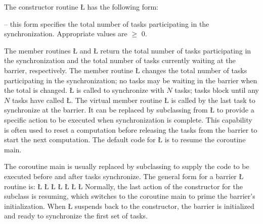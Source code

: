 \documentclass[openright,twoside]{report}
\begin{document}
The constructor routine \LGinlinetrue\LGbegin\lgrinde\L{}\endlgrinde\LGend{} has the following form:
\begin{prefix}
\item[\LGinlinetrue\LGbegin\lgrinde\L{\LB{\V{uBarrier}(\0\K{unsigned}\0\K{int}\0\V{total}\0)}}\endlgrinde\LGend{}]
-- this form specifies the total number of tasks participating in the synchronization.
Appropriate values are $\geq$ 0.
\end{prefix}

The member routines \LGinlinetrue\LGbegin\lgrinde\L{}\endlgrinde\LGend{} and \LGinlinetrue\LGbegin\lgrinde\L{}\endlgrinde\LGend{} return the total number of tasks participating in the synchronization and the total number of tasks currently waiting at the barrier, respectively.
The member routine \LGinlinetrue\LGbegin\lgrinde\L{}\endlgrinde\LGend{} changes the total number of tasks participating in the synchronization;
no tasks may be waiting in the barrier when the total is changed.
\LGinlinetrue\LGbegin\lgrinde\L{}\endlgrinde\LGend{} is called to synchronize with $N$ tasks;
tasks block until any $N$ tasks have called \LGinlinetrue\LGbegin\lgrinde\L{}\endlgrinde\LGend{}.
The virtual member routine \LGinlinetrue\LGbegin\lgrinde\L{}\endlgrinde\LGend{} is called by the last task to synchronize at the barrier.
It can be replaced by subclassing from \LGinlinetrue\LGbegin\lgrinde\L{}\endlgrinde\LGend{} to provide a specific action to be executed when synchronization is complete.
This capability is often used to reset a computation before releasing the tasks from the barrier to start the next computation.
The default code for \LGinlinetrue\LGbegin\lgrinde\L{}\endlgrinde\LGend{} is to resume the coroutine main.

The coroutine main is usually replaced by subclassing to supply the code to be executed before and after tasks synchronize.
The general form for a barrier \LGinlinetrue\LGbegin\lgrinde\L{}\endlgrinde\LGend{} routine is:
\LGinlinefalse\LGbegin\lgrinde
\L{}
\L{\LB{}}
\L{\LB{}}
\CE{}\L{\LB{}}
\L{\LB{}}
\CE{}\L{\LB{}}
\L{\LB{\}}}
\endlgrinde\LGend
Normally, the last action of the constructor for the subclass is resuming, which switches to the coroutine main to prime the barrier's initialization.
When \LGinlinetrue\LGbegin\lgrinde\L{}\endlgrinde\LGend{} suspends back to the constructor, the barrier is initialized and ready to synchronize the first set of tasks.
\end{document}
